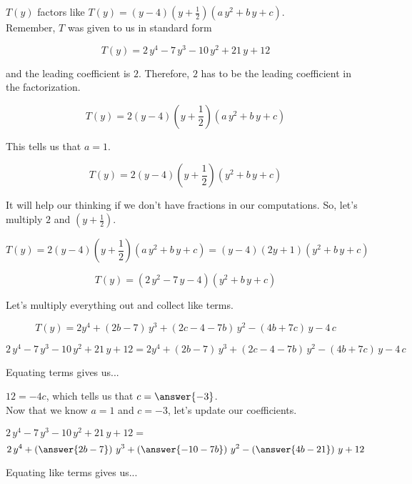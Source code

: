 \documentclass{ximera}
\begin{document}
\begin{explanation}



$T(y)$ factors like $T(y) = (y-4) \left(y+\frac{1}{2}\right) (a \, y^2 + b \, y + c)$. \\


Remember, $T$ was given to us in standard form

\[   T(y) = 2\, y^4 - 7 \, y^3 - 10 \, y^2 + 21 \, y + 12   \]


and the leading coefficient is $2$.  Therefore, $2$ has to be the leading coefficient in the factorization.

\[   T(y) = 2 (y-4) \left(y+\frac{1}{2}\right) (a \, y^2 + b \, y + c)   \]

This tells us that $a = 1$.


\[   T(y) = 2 (y-4) \left(y+\frac{1}{2}\right) (y^2 + b \, y + c)   \]




 It will help our thinking if we don't have fractions in our computations. So, let's multiply $2$ and $\left(y+\frac{1}{2}\right)$.



\[
T(y) = 2 (y-4) \left(y+\frac{1}{2}\right) (a \, y^2 + b \, y + c) = (y-4) (2y+1) (y^2 + b \, y + c)
\]


\[
T(y) = (2 \, y^2 - 7 \, y - 4) (y^2 + b \, y + c)
\]


Let's multiply everything out and collect like terms.


\[
T(y) = 2 y^4 + (2 b - 7) \, y^3 + (2c - 4 - 7 b) \, y^2 - (4 b + 7 c) \, y - 4 \, c
\]


\[
2\, y^4 - 7 \, y^3 - 10 \, y^2 + 21 \, y + 12 = 2 y^4 + (2 b - 7) \, y^3 + (2c - 4 - 7 b) \, y^2 - (4 b + 7 c) \, y - 4 \, c
\]


Equating terms gives us...



$12 = -4 c$, which tells us that $c =  \answer{-3}$. \\



Now that we know $a = 1$ and $c = -3$, let's update our coefficients.


$2\, y^4 - 7 \, y^3 - 10 \, y^2 + 21 \, y + 12 =$
\[
2 \, y^4 + \left( \answer{2 b - 7 } \right) \, y^3 + \left( \answer{-10 - 7 b} \right) \, y^2 - \left( \answer{4 b - 21} \right) \, y + 12
\]




Equating like terms gives us...



\end{explanation}
\end{document}
